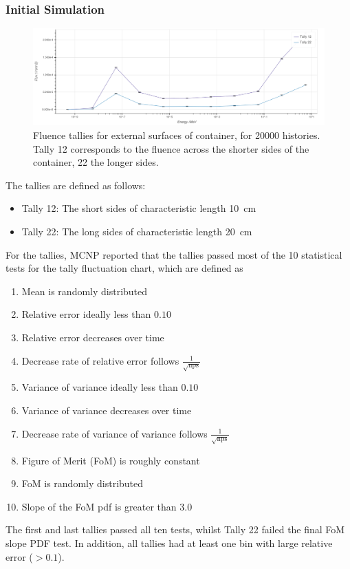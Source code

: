 \documentclass{article}
\begin{document}
    \subsubsection{Initial Simulation}
      \begin{figure}[htb]
        \includegraphics[width=\textwidth]{tallies.png}
        \caption{Fluence tallies for external surfaces of container, for \num{20000} histories. Tally 12 corresponds to the fluence across the shorter sides of the container, 22 the longer sides.}
        \label{fig:tallies_20000}
      \end{figure}

    The tallies are defined as follows:
    \begin{itemize}
      \item Tally 12: The short sides of characteristic length \SI{10}{\cm}
      \item Tally 22: The long sides of characteristic length \SI{20}{\cm}
    \end{itemize}

    For the tallies, MCNP reported that the tallies passed most of the 10 statistical tests for the tally fluctuation chart, which are defined as
    \begin{enumerate}
      \item Mean is randomly distributed
      \item Relative error ideally less than $0.10$
      \item Relative error decreases over time
      \item Decrease rate of relative error follows $\frac{1}{\sqrt{\text{nps}}}$
      \item Variance of variance ideally less than $0.10$
      \item Variance of variance decreases over time
      \item Decrease rate of variance of variance follows $\frac{1}{\sqrt{\text{nps}}}$
      \item Figure of Merit (FoM) is roughly constant
      \item FoM is randomly distributed
      \item Slope of the FoM pdf is greater than $3.0$
    \end{enumerate}
    The first and last tallies passed all ten tests, whilst Tally 22 failed the final FoM slope PDF test. In addition, all tallies had at least one bin with large relative error ($>0.1$).
\end{document}
